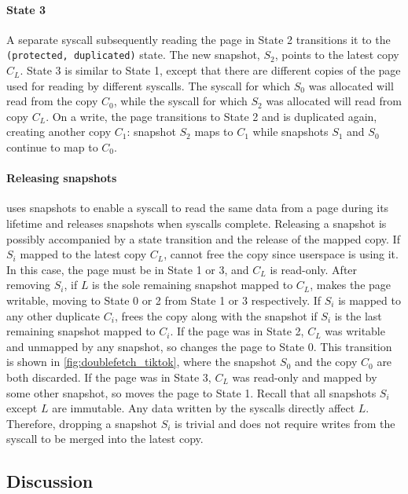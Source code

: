 \documentclass[letterpaper,twocolumn,10pt]{article}
\begin{document}
\paragraph{State 3}
A separate syscall subsequently reading the page in State 2 transitions 
it to the \texttt{(protected, duplicated)} state. 
The new snapshot, $S_2$, points to the latest copy $C_L$.
State 3 is similar to State 1, except that there are different copies of 
the page used for reading by different syscalls. 
The syscall for which $S_0$ was allocated will read from the copy $C_0$,
while the syscall for which $S_2$ was allocated will read from copy $C_L$.
On a write, the page transitions to State 2 and is duplicated again,
creating another copy $C_1$: snapshot $S_2$ maps to $C_1$ while 
snapshots $S_1$ and $S_0$ continue to map to $C_0$. 

\paragraph{Releasing snapshots}
\tiktok uses snapshots to enable a syscall to read the same data from a page 
during its lifetime and releases snapshots when syscalls complete. 
Releasing a snapshot is possibly accompanied by a state transition
and the release of the mapped copy.
If $S_i$ mapped to the latest copy $C_L$, \tiktok cannot free the copy
since userspace is using it.
In this case, the page must be in State 1 or 3, and $C_L$ is read-only.
After removing $S_i$, if $L$ is the sole remaining snapshot mapped to $C_L$, 
\tiktok makes the page writable, moving to State 0 or 2 from State
1 or 3 respectively. 
If $S_i$ is mapped to any other duplicate $C_i$, \tiktok frees the copy along
with the snapshot if $S_i$ is the last remaining snapshot mapped to $C_i$.
If the page was in State 2, $C_L$ was writable and unmapped by any snapshot,
so \tiktok changes the page to State 0.
This transition is shown in \autoref{fig:doublefetch_tiktok}, where the 
snapshot $S_0$ and the copy $C_0$ are both discarded.
If the page was in State 3, $C_L$ was read-only and mapped by some other
snapshot, so \tiktok moves the page to State 1.
Recall that all snapshots $S_i$ except $L$ are immutable.
Any data written by the syscalls directly affect $L$. 
Therefore, dropping a snapshot $S_i$ is trivial and does not require 
writes from the syscall to be merged into the latest copy.

\subsection{Discussion}
\label{sec:design:discussion}
\end{document}
